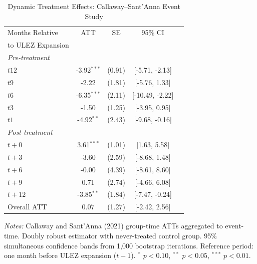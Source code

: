 \begin{table}[H]
\centering
\caption{Dynamic Treatment Effects: Callaway--Sant'Anna Event Study}
\label{tab:eventstudy}
\begin{threeparttable}
\begin{tabular}{lcccc}
\toprule
Months Relative & ATT & SE & 95\% CI & \\
to ULEZ Expansion & & & & \\
\midrule
\multicolumn{5}{l}{\textit{Pre-treatment}} \\
$t  12$ & -3.92$^{***}$ & (0.91) & [-5.71, -2.13] & \\
$t  9$ & -2.22 & (1.81) & [-5.76, 1.33] & \\
$t  6$ & -6.35$^{***}$ & (2.11) & [-10.49, -2.22] & \\
$t  3$ & -1.50 & (1.25) & [-3.95, 0.95] & \\
$t  1$ & -4.92$^{**}$ & (2.43) & [-9.68, -0.16] & \\
\midrule
\multicolumn{5}{l}{\textit{Post-treatment}} \\
$t + 0$ & 3.61$^{***}$ & (1.01) & [1.63, 5.58] & \\
$t + 3$ & -3.60 & (2.59) & [-8.68, 1.48] & \\
$t + 6$ & -0.00 & (4.39) & [-8.61, 8.60] & \\
$t + 9$ & 0.71 & (2.74) & [-4.66, 6.08] & \\
$t + 12$ & -3.85$^{**}$ & (1.84) & [-7.47, -0.24] & \\
\midrule
Overall ATT & 0.07 & (1.27) & [-2.42, 2.56] & \\
\bottomrule
\end{tabular}
\begin{tablenotes}[flushleft]
\small
\item \textit{Notes:} Callaway and Sant'Anna (2021) group-time ATTs aggregated to event-time. Doubly robust estimator with never-treated control group. 95\% simultaneous confidence bands from 1,000 bootstrap iterations. Reference period: one month before ULEZ expansion ($t-1$). $^{*}$ $p<0.10$, $^{**}$ $p<0.05$, $^{***}$ $p<0.01$.
\end{tablenotes}
\end{threeparttable}
\end{table}
